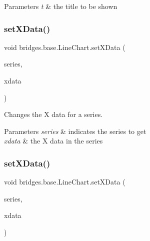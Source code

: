 \begin{DoxyParams}{Parameters}
{\em t} & the title to be shown \\
\hline
\end{DoxyParams}
\mbox{\label{classbridges_1_1base_1_1_line_chart_a2918179283e8280d47abb43df3c59195}} 
\subsubsection{\texorpdfstring{set\+X\+Data()}{setXData()}\hspace{0.1cm}{\footnotesize\ttfamily [1/2]}}
{\footnotesize\ttfamily void bridges.\+base.\+Line\+Chart.\+set\+X\+Data (\begin{DoxyParamCaption}\item[{String}]{series,  }\item[{double \mbox{[}$\,$\mbox{]}}]{xdata }\end{DoxyParamCaption})}



Changes the X data for a series. 


\begin{DoxyParams}{Parameters}
{\em series} & indicates the series to get \\
\hline
{\em xdata} & the X data in the series \\
\hline
\end{DoxyParams}
\mbox{\label{classbridges_1_1base_1_1_line_chart_a2f141ec46fdafd92fb0d86900a2de46a}} 
\subsubsection{\texorpdfstring{set\+X\+Data()}{setXData()}\hspace{0.1cm}{\footnotesize\ttfamily [2/2]}}
{\footnotesize\ttfamily void bridges.\+base.\+Line\+Chart.\+set\+X\+Data (\begin{DoxyParamCaption}\item[{String}]{series,  }\item[{Array\+List$<$ Double $>$}]{xdata }\end{DoxyParamCaption})}




